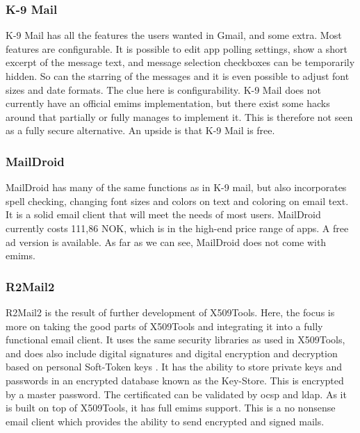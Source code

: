 \subsubsection{K-9 Mail}
K-9 Mail has all the features the users wanted in Gmail, and some extra. Most features are configurable. It is possible to edit app polling settings, show a short excerpt of the message text, and message selection checkboxes can be temporarily hidden. So can the starring of the messages and it is even possible to adjust font sizes and date formats. The clue here is configurability. K-9 Mail does not currently have an official \gls{emims} implementation, but there exist some hacks around that partially or fully manages to implement it. This is therefore not seen as a fully secure alternative. An upside is that K-9 Mail is free.

\subsubsection{MailDroid}
MailDroid has many of the same functions as in K-9 mail, but also incorporates spell checking, changing font sizes and colors on text and coloring on email text. It is a solid email client that will meet the needs of most users. MailDroid currently costs 111,86 NOK, which is in the high-end price range of apps. A free ad version is available. As far as we can see, MailDroid does not come with \gls{emims}. 

\subsubsection{R2Mail2}
R2Mail2 is the result of further development of X509Tools. Here, the focus is more on taking the good parts of X509Tools and integrating it into a fully functional email client. It uses the same security libraries as used in X509Tools, and does also include digital signatures and digital encryption and decryption based on personal Soft-Token keys \cite{bib:r2mail2}. It has the ability to store private keys and passwords in an encrypted database known as the Key-Store. This is encrypted by a master password. The certificated can be validated by \gls{ocsp} and \gls{ldap}. As it is built on top of X509Tools, it has full \gls{emims} support. This is a no nonsense email client which provides the ability to send encrypted and signed mails.


